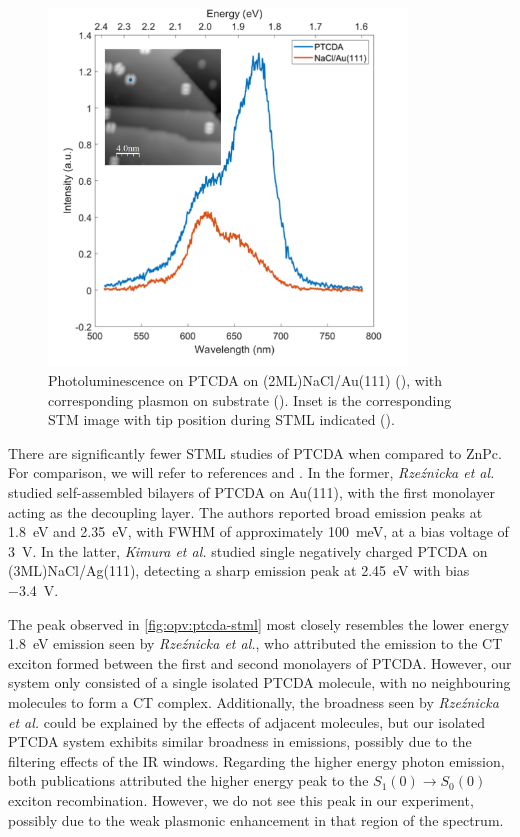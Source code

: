 \begin{figure} [h]
    \centering
        \includegraphics[width=0.85\textwidth]{pictures/ptcda_+ve_emission_inset.png}
    \caption{Photoluminescence on PTCDA on (2ML)NaCl/Au(111) (), with corresponding plasmon on substrate (). Inset is the corresponding STM image with tip position during STML indicated (). }
    \label{fig:opv:ptcda-stml}
\end{figure}

There are significantly fewer \ac{STML} studies of PTCDA when compared to ZnPc. For comparison, we will refer to references \citep{Rzeznicka2011} and \citep{Kimura2019}. In the former, \textit{Rze\'znicka et al.} studied self-assembled bilayers of PTCDA on Au(111), with the first monolayer acting as the decoupling layer. The authors reported broad emission peaks at \SI{1.8}{eV} and \SI{2.35}{eV}, with FWHM of approximately \SI{100}{meV}, at a bias voltage of \SI{3}{V}. In the latter, \textit{Kimura et al.} studied single negatively charged PTCDA on (3ML)NaCl/Ag(111), detecting a sharp emission peak at \SI{2.45}{eV} with bias \SI{-3.4}{V}. 

The peak observed in \autoref{fig:opv:ptcda-stml} most closely resembles the lower energy \SI{1.8}{eV} emission seen by \textit{Rze\'znicka et al.}, who attributed the emission to the \ac{CT} exciton formed between the first and second monolayers of PTCDA. However, our system only consisted of a single isolated PTCDA molecule, with no neighbouring molecules to form a \ac{CT} complex. Additionally, the broadness seen by \textit{Rze\'znicka et al.} could be explained by the effects of adjacent molecules, but our isolated PTCDA system exhibits similar broadness in emissions, possibly due to the filtering effects of the IR windows. Regarding the higher energy photon emission, both publications attributed the higher energy peak to the $S_1(0) \rightarrow S_0(0)$ exciton recombination. However, we do not see this peak in our experiment, possibly due to the weak plasmonic enhancement in that region of the spectrum.


